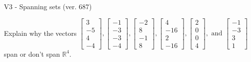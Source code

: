 \begin{exercise}
  \begin{exerciseTitle}V3 - Spanning sets (ver. 687)\end{exerciseTitle}
  \begin{exerciseStatement}
    Explain why the vectors \(\left[\begin{array}{r}
3 \\
-5 \\
4 \\
-4
\end{array}\right] , \left[\begin{array}{r}
-1 \\
-3 \\
-3 \\
-4
\end{array}\right] , \left[\begin{array}{r}
-2 \\
8 \\
-1 \\
8
\end{array}\right] , \left[\begin{array}{r}
4 \\
-16 \\
2 \\
-16
\end{array}\right] , \left[\begin{array}{r}
2 \\
0 \\
0 \\
4
\end{array}\right] , \text{ and } \left[\begin{array}{r}
-1 \\
-3 \\
3 \\
1
\end{array}\right]\) span or don't span \(\mathbb{R}^4\). 
	



\end{exerciseStatement}
\end{exercise}
